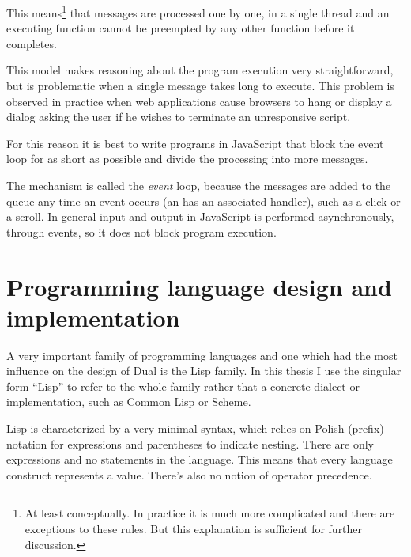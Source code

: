 This means\footnote{At least conceptually. In practice it is much more complicated and there are exceptions to these rules. But this explanation is sufficient for further discussion.} that messages are processed one by one, in a single thread and an executing function cannot be preempted by any other function before it completes.

This model makes reasoning about the program execution very straightforward, but is problematic when a single message takes long to execute. This problem is observed in practice when web applications cause browsers to hang or display a dialog asking the user if he wishes to terminate an unresponsive script.

For this reason it is best to write programs in JavaScript that block the event loop for as short as possible and divide the processing into more messages.

The mechanism is called the \textit{event} loop, because the messages are added to the queue any time an event occurs (an has an associated handler), such as a click or a scroll. In general input and output in JavaScript is performed asynchronously, through events, so it does not block program execution.


\section{Programming language design and implementation}
A very important family of programming languages and one which had the most influence on the design of Dual is the Lisp family. In this thesis I use the singular form ``Lisp'' to refer to the whole family rather that a concrete dialect or implementation, such as Common Lisp or Scheme.

Lisp is characterized by a very minimal syntax, which relies on Polish (prefix) notation for expressions and parentheses to indicate nesting. There are only expressions and no statements in the language. This means that every language construct represents a value. There's also no notion of operator precedence.

